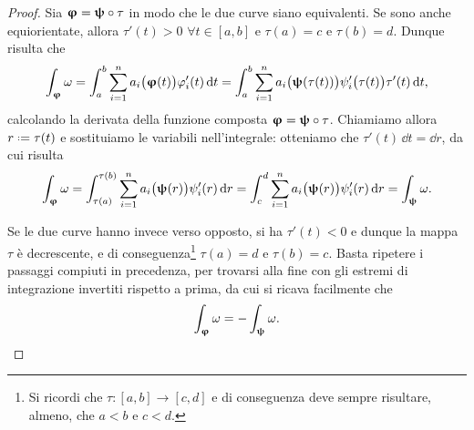 \begin{proof}
	Sia $\bm{\upvarphi}=\bm{\uppsi}\circ\tau$ in modo che le due curve siano equivalenti.
	Se sono anche equiorientate, allora $\tau'(t)>0$ $\forall t\in[a,b]$ e $\tau(a)=c$ e $\tau(b)=d$.
	Dunque risulta che
	\begin{equation}
		\int_{\bm{\upvarphi}}\omega=\int_a^b\sum_{i=1}^na_i\big(\bm{\upvarphi}(t)\big)\varphi_i'(t)\,\textup{d} t
		=\int_a^b\sum_{i=1}^na_i\big(\bm{\uppsi}(\tau(t))\big)\psi_i'\big(\tau(t)\big)\tau'(t)\,\textup{d} t,
	\end{equation}
	calcolando la derivata della funzione composta $\bm{\upvarphi}=\bm{\uppsi}\circ\tau$.
	Chiamiamo allora $r\defeq\tau(t)$ e sostituiamo le variabili nell'integrale: otteniamo che $\tau'(t)\,\dd t=\dd r$, da cui risulta
	\begin{equation}
		\int_{\bm{\upvarphi}}\omega=\int_{\tau(a)}^{\tau(b)}\sum_{i=1}^na_i\big(\bm{\uppsi}(r)\big)\psi_i'(r)\,\textup{d} r
		=\int_c^d\sum_{i=1}^na_i\big(\bm{\uppsi}(r)\big)\psi_i'(r)\,\textup{d} r=\int_{\bm{\uppsi}}\omega.
	\end{equation}
	
	Se le due curve hanno invece verso opposto, si ha $\tau'(t)<0$ e dunque la mappa $\tau$ è decrescente, e di conseguenza\footnote{Si ricordi che $\tau\colon[a,b]\to[c,d]$ e di conseguenza deve sempre risultare, almeno, che $a<b$ e $c<d$.} $\tau(a)=d$ e $\tau(b)=c$. Basta ripetere i passaggi compiuti in precedenza, per trovarsi alla fine con gli estremi di integrazione invertiti rispetto a prima, da cui si ricava facilmente che
	\begin{equation*}
		\int_{\bm{\upvarphi}}\omega=-\int_{\bm{\uppsi}}\omega.\qedhere
	\end{equation*}
\end{proof}


